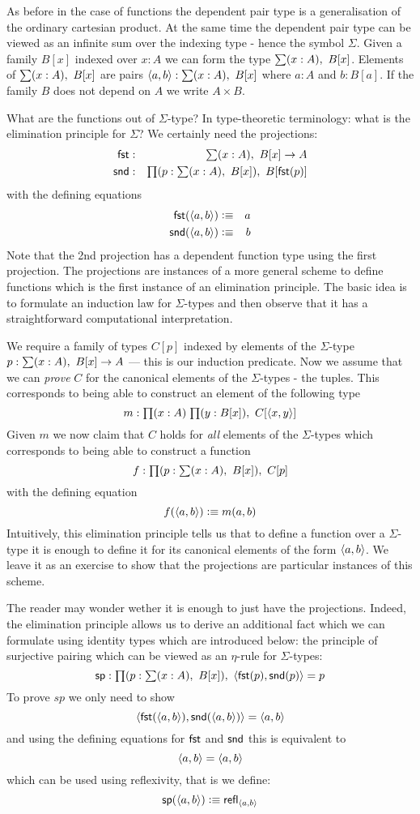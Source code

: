 As before in the case of functions the dependent pair type is a
generalisation of the ordinary cartesian product. At the same time 
the dependent pair type can be viewed as an infinite sum over the
indexing type - hence  the symbol $\Sigma$. Given a family $B[x]$
indexed over $x:A$ we can form the type $\sm{x:A}B[x]$. Elements of $\sm{x:A}B[x]$ are
pairs $\tup{a}{b} : \sm{x:A}B[x]$ where $a:A$ and $b:B[a]$. If the
family $B$ does not depend on $A$ we write $A \times B$.

What are the functions out of $\Sigma$-type? In type-theoretic
terminology: what is the elimination principle for $\Sigma$? We certainly need the projections:
\begin{eqnarray*}
  \fst & : & \sm{x : A}B[x] \to A \\
  \snd & : & \prd{p:\sm{x : A}B[x]}B[\fst(p)]
\end{eqnarray*}
with the defining equations 
\begin{eqnarray*}
  \mathsf{fst}(\langle a,b\rangle) & \vcentcolon\equiv & a \\
  \mathsf{snd}(\langle a,b\rangle) & \vcentcolon\equiv & b
\end{eqnarray*}
Note that the 2nd projection has a dependent function type using the
first projection. The projections are instances of a more general
scheme to define functions which is the first instance of an
elimination principle. The basic idea is to formulate an induction law
for $\Sigma$-types and then observe that it has a straightforward
computational interpretation.

We require a family of types $C[p]$ indexed by elements of the
$\Sigma$-type $p : \sm{x : A}B[x] \to A$ --- this is our induction
predicate. Now we assume that we can \emph{prove} $C$ for the canonical
elements of the $\Sigma$-types - the tuples. This corresponds to being
able to construct an element of the following type
\[ m:\prd{x:A}{y:B[x]}C[\tup{x}{y}] \]
Given $m$ we now claim that $C$ holds for \emph{all} elements of the
$\Sigma$-types which corresponds to being able to construct a function 
\[ f : \prd{p:\sm{x : A}B[x]}C[p]\]
with the defining equation
\[ f(\langle a,b\rangle) \vcentcolon\equiv m(a,b) \]
Intuitively, this elimination principle tells us that to define a
function over a $\Sigma$-type it is enough to define it for its
canonical elements of the form $\langle a,b\rangle$. We leave it as an
exercise to show that the projections are particular instances of this
scheme. 

The reader may wonder wether it is enough to just have the
projections. Indeed, the elimination principle allows us to derive an
additional fact which we can formulate using identity types which are
introduced below: the principle of surjective pairing which can be
viewed as an $\eta$-rule for $\Sigma$-types:
\[ \spr : \prd{p : \sm{x:A} B[x]} \tup{\fst(p)}{\snd(p)} = p \]
To prove $sp$ we only need to show
\[ \langle \mathsf{fst}(\langle a,b\rangle),\mathsf{snd}(\langle a,b\rangle)\rangle = \langle a,b\rangle \]
and using the defining equations for $\mathsf{fst}$ and $\mathsf{snd}$ this is
equivalent to
\[ \langle a,b\rangle = \langle a,b\rangle \]
which can be used using reflexivity, that is we define:
\[ \mathsf{sp}(\langle a,b\rangle) \vcentcolon\equiv \mathsf{refl}_{\langle a,b\rangle} \]


